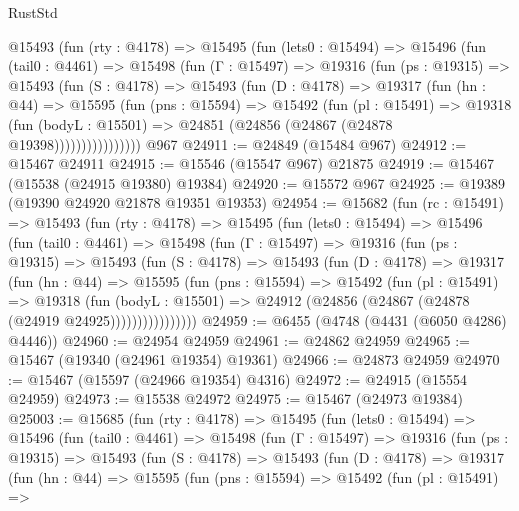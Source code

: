\begin{lexlean}{RustStd}
\begin{coremodule}
      @15493
        (fun (rty : @4178) =>
        @15495
          (fun (lets0 : @15494) =>
          @15496
            (fun (tail0 : @4461) =>
            @15498
              (fun (Γ : @15497) =>
              @19316
                (fun (ps : @19315) =>
                @15493
                  (fun (S : @4178) =>
                  @15493
                    (fun (D : @4178) =>
                    @19317
                      (fun (hn : @44) =>
                      @15595
                        (fun (pns : @15594) =>
                        @15492
                          (fun (pl : @15491) =>
                          @19318
                            (fun (bodyL : @15501) =>
                            @24851 (@24856 (@24867 (@24878 @19398))))))))))))))))
    @967
@24911 := @24849 (@15484 @967)
@24912 := @15467 @24911
@24915 := @15546 (@15547 @967) @21875
@24919 := @15467 (@15538 (@24915 @19380) @19384)
@24920 := @15572 @967
@24925 := @19389 (@19390 @24920 @21878 @19351 @19353)
@24954 := @15682
    (fun (rc : @15491) =>
    @15493
      (fun (rty : @4178) =>
      @15495
        (fun (lets0 : @15494) =>
        @15496
          (fun (tail0 : @4461) =>
          @15498
            (fun (Γ : @15497) =>
            @19316
              (fun (ps : @19315) =>
              @15493
                (fun (S : @4178) =>
                @15493
                  (fun (D : @4178) =>
                  @19317
                    (fun (hn : @44) =>
                    @15595
                      (fun (pns : @15594) =>
                      @15492
                        (fun (pl : @15491) =>
                        @19318
                          (fun (bodyL : @15501) =>
                          @24912 (@24856 (@24867 (@24878 (@24919 @24925))))))))))))))))
@24959 := @6455 (@4748 (@4431 (@6050 @4286) @4446))
@24960 := @24954 @24959
@24961 := @24862 @24959
@24965 := @15467 (@19340 (@24961 @19354) @19361)
@24966 := @24873 @24959
@24970 := @15467 (@15597 (@24966 @19354) @4316)
@24972 := @24915 (@15554 @24959)
@24973 := @15538 @24972
@24975 := @15467 (@24973 @19384)
@25003 := @15685
    (fun (rty : @4178) =>
    @15495
      (fun (lets0 : @15494) =>
      @15496
        (fun (tail0 : @4461) =>
        @15498
          (fun (Γ : @15497) =>
          @19316
            (fun (ps : @19315) =>
            @15493
              (fun (S : @4178) =>
              @15493
                (fun (D : @4178) =>
                @19317
                  (fun (hn : @44) =>
                  @15595
                    (fun (pns : @15594) =>
                    @15492
                      (fun (pl : @15491) =>

\end{coremodule}
\end{lexlean}
